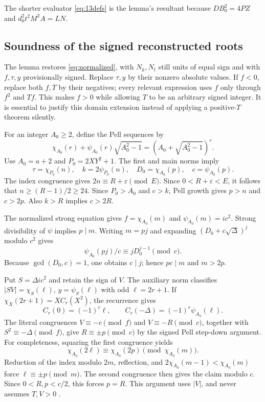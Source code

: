 \documentclass[11pt,a4paper]{article}
\theoremstyle{remark}\newtheorem{remark}[theorem]{Remark}
\begin{document}
The shorter evaluator \eqref{eq:13defs} is the lemma's resultant because
$DB_0^2=4PZ$ and $d_0^2t^2M^2A=LN$.

\subsection{Soundness of the signed reconstructed roots}
The lemma restores \eqref{eq:normalized}, with $N_k,N_t$ still units
of equal sign and with $f,\tau,y$ provisionally signed. Replace
$\tau,y$ by their nonzero absolute values. If $f<0$, replace both
$f,T$ by their negatives; every relevant expression uses $f$ only
through $f^2$ and $Tf$. This makes $f>0$ while allowing $T$ to be
an arbitrary signed integer. It is essential to justify this domain
extension instead of applying a positive-$T$ theorem silently.

For an integer $A_0\ge2$, define the Pell sequences by
\[
 \chi_{A_0}(r)+\psi_{A_0}(r)\sqrt{A_0^2-1}
 =(A_0+\sqrt{A_0^2-1})^r.
\]
Use $A_0=a+2$ and $P_0=2XY^2+1$. The first and main norms imply
\[
 \tau=\chi_{P_0}(n),\quad k=2\psi_{P_0}(n),\quad
 D_0=\chi_{A_0}(p),\quad c=\psi_{A_0}(p).
\]
The index congruence gives $2n\equiv R+\varepsilon\pmod E$.
Since $0<R+\varepsilon<E$, it follows that
$n\ge(R-1)/2\ge24$. Since $P_0>A_0$ and $c>k$, Pell growth gives
$p>n$ and $c>2p$. Also $k>R$ implies $c>2R$.

The normalized strong equation gives
$f=\chi_{A_0}(m)$ and $\psi_{A_0}(m)=ic^2$. Strong divisibility of
$\psi$ implies $p\mid m$. Writing $m=pj$ and expanding
$(D_0+c\sqrt\Delta)^j$ modulo $c^2$ gives
\[
 \psi_{A_0}(pj)/c\equiv jD_0^{j-1}\pmod c.
\]
Because $\gcd(D_0,c)=1$, one obtains $c\mid j$; hence
$pc\mid m$ and $m>2p$.

Put $S=\Delta ic^2$ and retain the sign of $V$. The auxiliary norm
classifies $|SV|=\chi_S(\ell)$, $y=\psi_S(\ell)$ with odd
$\ell=2r+1$. If $\chi_X(2r+1)=X C_r(X^2)$, the recurrence gives
\[
 C_r(0)=(-1)^r\ell,\qquad C_r(-\Delta)=(-1)^r\psi_{A_0}(\ell).
\]
The literal congruences $V\equiv-c\pmod f$ and
$V\equiv-R\pmod c$, together with $S^2\equiv-\Delta\pmod f$,
give $R\equiv\pm p\pmod c$ by the signed Pell step-down argument.
For completeness, squaring the first congruence yields
\[
 \chi_{A_0}(2\ell)\equiv\chi_{A_0}(2p)\pmod{\chi_{A_0}(m)}.
\]
Reduction of the index modulo $2m$, reflection, and
$2\chi_{A_0}(m-1)<\chi_{A_0}(m)$ force
$\ell\equiv\pm p\pmod m$. The second congruence then gives the
claim modulo $c$. Since $0<R,p<c/2$, this forces $p=R$.
This argument uses $|V|$, and never assumes $T,V>0$
\cite{signed,scout}.
\end{document}
